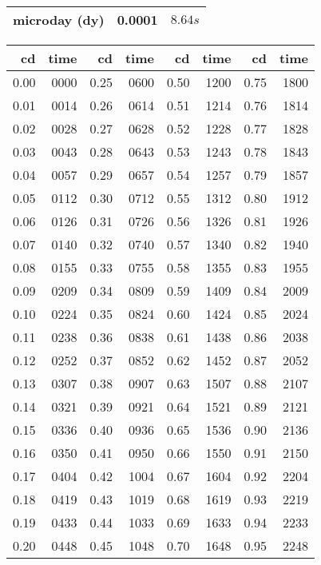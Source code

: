 \documentclass[10pt]{book}
\begin{document}
\begin{center}
\begin{tabular}{rrr}
        microday (\textmu{}dy) &               0.0001 & $\unit{8.64}{s}$ \\
        \bottomrule
    \end{tabular}
    \hfill
    \begin{tabular}{rr|rr|rr|rr}
        \toprule
        \textbf{cd} & \textbf{time} &\textbf{cd} & \textbf{time} &\textbf{cd} & \textbf{time} &\textbf{cd} & \textbf{time} \\
        \midrule
        0.00 & 0000 & 0.25 & 0600 & 0.50 & 1200 & 0.75 & 1800 \\
        0.01 & 0014 & 0.26 & 0614 & 0.51 & 1214 & 0.76 & 1814 \\
        0.02 & 0028 & 0.27 & 0628 & 0.52 & 1228 & 0.77 & 1828 \\
        0.03 & 0043 & 0.28 & 0643 & 0.53 & 1243 & 0.78 & 1843 \\
        0.04 & 0057 & 0.29 & 0657 & 0.54 & 1257 & 0.79 & 1857 \\
        0.05 & 0112 & 0.30 & 0712 & 0.55 & 1312 & 0.80 & 1912 \\
        0.06 & 0126 & 0.31 & 0726 & 0.56 & 1326 & 0.81 & 1926 \\
        0.07 & 0140 & 0.32 & 0740 & 0.57 & 1340 & 0.82 & 1940 \\
        0.08 & 0155 & 0.33 & 0755 & 0.58 & 1355 & 0.83 & 1955 \\
        0.09 & 0209 & 0.34 & 0809 & 0.59 & 1409 & 0.84 & 2009 \\
        0.10 & 0224 & 0.35 & 0824 & 0.60 & 1424 & 0.85 & 2024 \\
        0.11 & 0238 & 0.36 & 0838 & 0.61 & 1438 & 0.86 & 2038 \\
        0.12 & 0252 & 0.37 & 0852 & 0.62 & 1452 & 0.87 & 2052 \\
        0.13 & 0307 & 0.38 & 0907 & 0.63 & 1507 & 0.88 & 2107 \\
        0.14 & 0321 & 0.39 & 0921 & 0.64 & 1521 & 0.89 & 2121 \\
        0.15 & 0336 & 0.40 & 0936 & 0.65 & 1536 & 0.90 & 2136 \\
        0.16 & 0350 & 0.41 & 0950 & 0.66 & 1550 & 0.91 & 2150 \\
        0.17 & 0404 & 0.42 & 1004 & 0.67 & 1604 & 0.92 & 2204 \\
        0.18 & 0419 & 0.43 & 1019 & 0.68 & 1619 & 0.93 & 2219 \\
        0.19 & 0433 & 0.44 & 1033 & 0.69 & 1633 & 0.94 & 2233 \\
        0.20 & 0448 & 0.45 & 1048 & 0.70 & 1648 & 0.95 & 2248 \\

\end{tabular}
\end{center}
\end{document}
